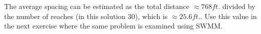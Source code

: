 \documentclass[12pt]{article}
\begin{document}
\begin{enumerate}
%
%
%
%

The average spacing can be estimated as the total distance $\approx 768 ft.$ divided by the number of reaches (in this solution 30), which is $\approx 25.6 ft.$.   Use this value in the next exercise where the same problem is examined using SWMM. 


\end{enumerate}
\end{document}
